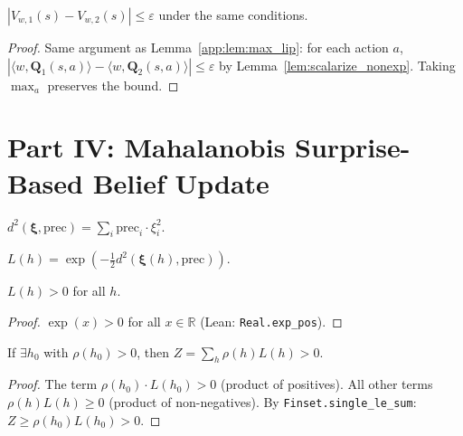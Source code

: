\begin{lemma}
$|V_{w,1}(s) - V_{w,2}(s)| \le \varepsilon$ under the same conditions.
\end{lemma}
\begin{proof}
Same argument as Lemma~\ref{app:lem:max_lip}: for each action $a$, $|\langle w, \mathbf{Q}_1(s,a) \rangle - \langle w, \mathbf{Q}_2(s,a) \rangle| \le \varepsilon$ by Lemma~\ref{lem:scalarize_nonexp}.  Taking $\max_a$ preserves the bound.
\end{proof}


\section{Part IV: Mahalanobis Surprise-Based Belief Update}
\label{app:mahalanobis}

\begin{definition}
$d^2(\boldsymbol{\xi}, \mathrm{prec}) = \sum_i \mathrm{prec}_i \cdot \xi_i^2$.
\end{definition}

\begin{definition}
$L(h) = \exp(-\frac{1}{2} d^2(\boldsymbol{\xi}(h), \mathrm{prec}))$.
\end{definition}

\begin{lemma}
$L(h) > 0$ for all $h$.
\end{lemma}
\begin{proof}
$\exp(x) > 0$ for all $x \in \mathbb{R}$ (Lean: \texttt{Real.exp\_pos}).
\end{proof}

\begin{lemma}
If $\exists h_0$ with $\rho(h_0) > 0$, then $Z = \sum_h \rho(h) L(h) > 0$.
\end{lemma}
\begin{proof}
The term $\rho(h_0) \cdot L(h_0) > 0$ (product of positives).  All other terms $\rho(h) L(h) \ge 0$ (product of non-negatives).  By \texttt{Finset.single\_le\_sum}: $Z \ge \rho(h_0) L(h_0) > 0$.
\end{proof}


